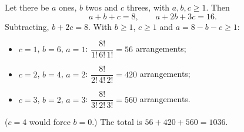 Let there be $a$ ones, $b$ twos and $c$ threes, with $a,b,c\ge1$. Then
\[a+b+c=8,\qquad a+2b+3c=16.\]
Subtracting, $b+2c=8$. With $b\ge1$, $c\ge1$ and $a=8-b-c\ge1$:
\begin{itemize}
\item $c=1$, $b=6$, $a=1$: $\dfrac{8!}{1!\,6!\,1!}=56$ arrangements;
\item $c=2$, $b=4$, $a=2$: $\dfrac{8!}{2!\,4!\,2!}=420$ arrangements;
\item $c=3$, $b=2$, $a=3$: $\dfrac{8!}{3!\,2!\,3!}=560$ arrangements.
\end{itemize}
($c=4$ would force $b=0$.) The total is $56+420+560=\boxed{1036}$.
